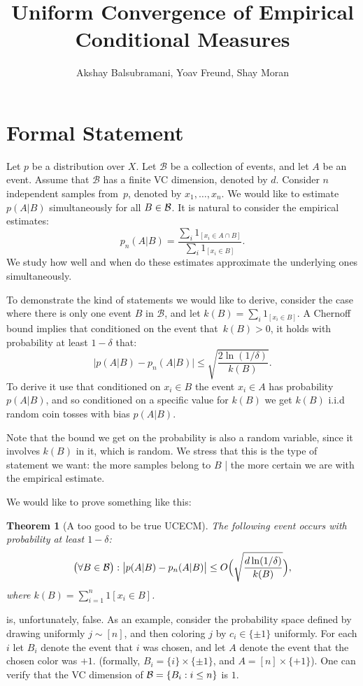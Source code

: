 \documentclass{article}
\title{Uniform Convergence of Empirical Conditional Measures}
\author{Akshay Balsubramani, Yoav Freund, Shay Moran}
\newtheorem{theorem}{Theorem}[section]
\newcommand{\B}{{\cal B}}
\newcommand{\cB}{\mathcal{B}}
\begin{document}
\maketitle

\section{Formal Statement}

Let $p$ be a distribution over $X$.
Let $\cB$ be a collection of events, and let $A$ be an event.
Assume that $\cB$ has a finite VC dimension, denoted by $d$.
Consider $n$ independent samples from~$p$, denoted by $x_1,\ldots,x_n$.
We would like to estimate $p(A \vert B)$ simultaneously for all $B\in \B$.
It is natural to consider the empirical estimates:
\[p_n(A\vert B)=\frac{\sum_i 1_{[x_i\in A \cap B]}}{\sum_i 1_{[x_i\in B]}}.\]
We study how well and when do these estimates approximate the underlying ones simultaneously.

To demonstrate the kind of statements we would like to derive,
consider the case where there is only one event $B$ in $\cB$, 
and let $k(B)=\sum_i 1_{[x_i\in B]}$.
A Chernoff bound implies that conditioned on the event that~$k(B)>0$, 
it holds with probability at least $1-\delta$ that:
\[\bigl\lvert p(A\vert B) - p_n(A \vert B) \bigr\rvert \leq \sqrt{\frac{2\ln(1/\delta)}{k(B)}}.\]
To derive it use that conditioned on $x_i\in B$ the event $x_i\in A$ has probability $p(A\vert B)$, 
and so conditioned on a specific value for $k(B)$ we get $k(B)$ i.i.d random coin tosses with bias $p(A\vert B)$.

Note that the bound we get on the probability is also a random variable, 
since it involves $k(B)$ in it, which is random.
We stress that this is the type of statement we want:
the more samples belong to $B$ | the more certain we are with the empirical estimate.

We would like to prove something like this:
\begin{theorem}[A too good to be true UCECM]\label{thm:toogood}
The following event occurs with probability at least $1-\delta$:
\[\bigl(\forall B\in\B\bigr):\bigl\lvert p(A \vert B) - p_n(A \vert B) \bigr\rvert \leq O\Bigl(\sqrt{\frac{d\ln(1/\delta)}{k(B)}}\Bigr),\]
where $k(B) = \sum_{i=1}^n 1[x_i\in B]$.
\end{theorem}
 is, unfortunately, false. 
As an example, consider the probability space defined by drawing uniformly $j\sim[n]$,
and then coloring $j$ by $c_i\in\{\pm 1\}$ uniformly.
For each $i$ let $B_i$ denote the event that $i$ was chosen,
and let $A$ denote the event that the chosen color was  $+1$.
(formally, $B_i = \{i\}\times\{\pm 1\}$, and $A=[n]\times\{+1\}$).
One can verify that the VC dimension of $\B=\{B_i : i\leq n\}$ is $1$.
\end{document}
